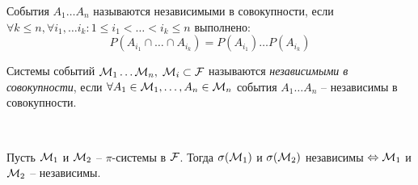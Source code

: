 \begin{definition}
	События $A_1 \ldots A_n$ называются независимыми в совокупности, если $\forall k \leq n, 
	\forall i_1, \ldots i_k : 1 \leq i_1 < \ldots < i_k \leq n$ выполнено:
	\begin{equation*}
		P(A_{i_1} \cap \ldots \cap A_{i_k}) = P(A_{i_1}) \ldots P(A_{i_k})
	\end{equation*}
\end{definition}

\begin{definition}
	Системы событий $\mathcal{M}_1 \ldots \mathcal{M}_n, \; \mathcal{M}_i \subset \mathcal{F}$ 
	называются \emph{независимыми в совокупности}, 
	если $\forall A_1 \in \mathcal{M}_1, \ldots, A_n \in \mathcal{M}_n$ 
	события $A_1 \ldots A_n$ -- независимы в совокупности.
\end{definition}

\begin{lemma}~

	Пусть $\mathcal{M}_1$ и $\mathcal{M}_2$ -- $\pi$-системы в $\mathcal{F}$.
	Тогда $\sigma(\mathcal{M}_1)$ и $\sigma(\mathcal{M}_2)$ независимы 
	$\Leftrightarrow \mathcal{M}_1$ и $\mathcal{M}_2$ -- независимы.

\end{lemma}

